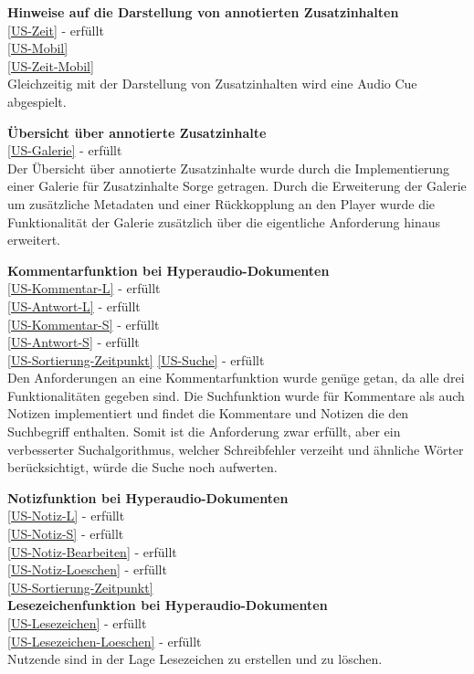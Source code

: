 \textbf{Hinweise auf die Darstellung von annotierten Zusatzinhalten}\\
\ref{US-Zeit} - erfüllt\\
\ref{US-Mobil}\\
\ref{US-Zeit-Mobil}\\
Gleichzeitig mit der Darstellung von Zusatzinhalten wird eine Audio Cue abgespielt.

\textbf{Übersicht über annotierte Zusatzinhalte}\\
\ref{US-Galerie} - erfüllt\\
Der Übersicht über annotierte Zusatzinhalte wurde durch die Implementierung einer Galerie für Zusatzinhalte Sorge getragen. Durch die Erweiterung der Galerie um zusätzliche Metadaten und einer Rückkopplung an den Player wurde die Funktionalität der Galerie zusätzlich über die eigentliche Anforderung hinaus erweitert.


\textbf{Kommentarfunktion bei Hyperaudio-Dokumenten}\\
\ref{US-Kommentar-L} - erfüllt\\
\ref{US-Antwort-L} - erfüllt\\
\ref{US-Kommentar-S} - erfüllt\\
\ref{US-Antwort-S} - erfüllt\\
\ref{US-Sortierung-Zeitpunkt}
\ref{US-Suche} - erfüllt\\
Den Anforderungen an eine Kommentarfunktion wurde genüge getan, da alle drei Funktionalitäten gegeben sind. Die Suchfunktion wurde für Kommentare als auch Notizen implementiert und findet die Kommentare und Notizen die den Suchbegriff enthalten. Somit ist die Anforderung zwar erfüllt, aber ein verbesserter Suchalgorithmus, welcher Schreibfehler verzeiht und ähnliche Wörter berücksichtigt, würde die Suche noch aufwerten.


\textbf{Notizfunktion bei Hyperaudio-Dokumenten}\\
\ref{US-Notiz-L} - erfüllt\\
\ref{US-Notiz-S} - erfüllt\\
\ref{US-Notiz-Bearbeiten} - erfüllt\\
\ref{US-Notiz-Loeschen} - erfüllt\\
\ref{US-Sortierung-Zeitpunkt}\\

\textbf{Lesezeichenfunktion bei Hyperaudio-Dokumenten}\\
\ref{US-Lesezeichen} - erfüllt\\
\ref{US-Lesezeichen-Loeschen} - erfüllt\\
Nutzende sind in der Lage Lesezeichen zu erstellen und zu löschen. 


